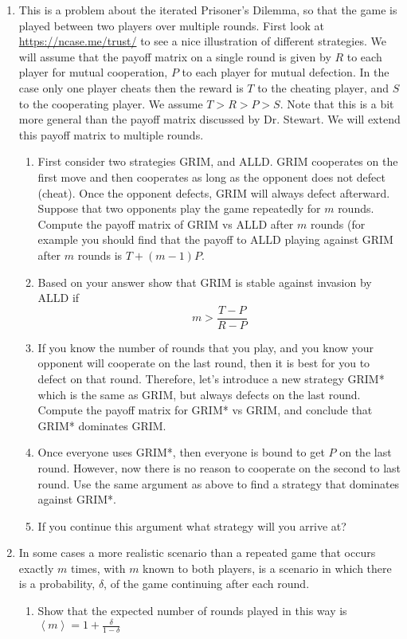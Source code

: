 \documentclass[12pt]{article}
\begin{document}
\begin{enumerate}
\item  This is a problem about the iterated Prisoner's Dilemma, so that the game is played between two players over multiple rounds.  First look at
\url{https://ncase.me/trust/} to see a nice illustration of different strategies.  We will assume
that the payoff matrix on a single round is given by $R$ to each player for mutual cooperation,
$P$ to each player for mutual defection. In the case only one player cheats then the reward is
$T$ to the cheating player, and $S$ to the cooperating player.   We assume $T > R > P  > S$.  Note that this is a bit more general than the payoff matrix discussed by Dr. Stewart. We will extend this payoff matrix to multiple rounds.
\begin{enumerate}
\item First consider two strategies GRIM, and ALLD.  GRIM cooperates on the first move
and then cooperates as long as the opponent does not defect (cheat).  Once the opponent defects,
GRIM will always defect afterward.  Suppose that two opponents play the game repeatedly for $m$ rounds.
Compute the payoff matrix of GRIM vs ALLD after $m$ rounds (for example you should find that the payoff to ALLD playing 
against GRIM after $m$ rounds is $T + (m-1) P$.
\item Based on your answer show that GRIM is stable against invasion by ALLD if 
$$
m > \frac{T - P}{R-P}
$$
\item If you know the number of rounds that you play, and you know your opponent will cooperate
on the last round, then it is best for you to defect on that round.  Therefore, let's introduce a new strategy
GRIM* which is the same as GRIM, but always defects on the last round. Compute the payoff matrix for
GRIM* vs GRIM, and conclude that GRIM* dominates GRIM.
\item Once everyone uses GRIM*, then everyone is bound to get $P$ on the last round.  However, now
there is no reason to cooperate on the second to last round.  Use the same argument as above to find a strategy
that dominates against GRIM*.  
\item If you continue this argument what strategy will you arrive at?  
\end{enumerate}
\item In some cases a more realistic scenario than a repeated game that occurs exactly $m$ times, with $m$ known to both players, is a scenario in which there is a probability, $\delta$, of the game continuing after each round. 
\begin{enumerate}
\item Show that the expected number of rounds played in this way is $\left<m\right>=1+\frac{\delta}{1-\delta}$

\end{enumerate}
\end{enumerate}
\end{document}
